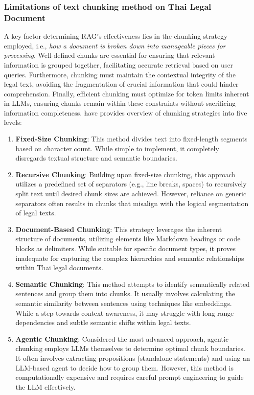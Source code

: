 \subsubsection{Limitations of text chunking method on Thai Legal Document}

A key factor determining RAG's effectiveness lies in the chunking strategy employed, i.e., \emph{how a document is broken down into manageable pieces for processing}. Well-defined chunks are essential for ensuring that relevant information is grouped together, facilitating accurate retrieval based on user queries. Furthermore, chunking must maintain the contextual integrity of the legal text, avoiding the fragmentation of crucial information that could hinder comprehension. Finally, efficient chunking must optimize for token limits inherent in LLMs, ensuring chunks remain within these constraints without sacrificing information completeness. \cite{5chunking} have provides overview of chunking strategies into five levels: %

\begin{enumerate}[label=Level \arabic*]
    \item \textbf{Fixed-Size Chunking}: This method divides text into fixed-length segments based on character count. While simple to implement, it completely disregards textual structure and semantic boundaries.
    \item \textbf{Recursive Chunking}: Building upon fixed-size chunking, this approach utilizes a predefined set of separators (e.g., line breaks, spaces) to recursively split text until desired chunk sizes are achieved. However, reliance on generic separators often results in chunks that misalign with the logical segmentation of legal texts.
    \item \textbf{Document-Based Chunking}: This strategy leverages the inherent structure of documents, utilizing elements like Markdown headings or code blocks as delimiters. While suitable for specific document types, it proves inadequate for capturing the complex hierarchies and semantic relationships within Thai legal documents.
    \item \textbf{Semantic Chunking}: This method attempts to identify semantically related sentences and group them into chunks. It usually involves calculating the semantic similarity between sentences using techniques like embeddings. While a step towards context awareness, it may struggle with long-range dependencies and subtle semantic shifts within legal texts.
    \item \textbf{Agentic Chunking}: Considered the most advanced approach, agentic chunking employs LLMs themselves to determine optimal chunk boundaries. It often involves extracting propositions (standalone statements) and using an LLM-based agent to decide how to group them. However, this method is computationally expensive and requires careful prompt engineering to guide the LLM effectively.
\end{enumerate}

